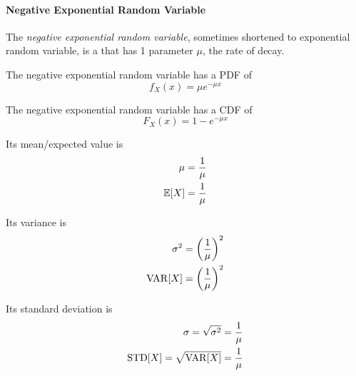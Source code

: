 \paragraph{Negative Exponential Random Variable}\label{par:Negative_Exponential_Random_Variable}
\begin{definition}\label{def:Negative_Exponential_Random_Variable}
  The \emph{negative exponential random variable}, sometimes shortened to exponential random variable, is a  that has 1 parameter $\mu$, the rate of decay.

  The negative exponential random variable has a PDF of
  \begin{equation}\label{eq:Negative_Exponential_Random_Variable-PDF}
    f_{X}(x) = \mu e^{-\mu x}
  \end{equation}

  The negative exponential random variable has a CDF of
  \begin{equation}\label{eq:Negative_Exponential_Random_Variable-CDF}
    F_{X}(x) = 1 - e^{-\mu x}
  \end{equation}

  Its mean/expected value is
  \begin{equation}\label{eq:Negative_Exponential_Random_Variable-Expected_Value}
    \begin{aligned}
      \mu &= \frac{1}{\mu} \\
      \operatorname{\operatorname{\mathbb{E}}}[X] &= \frac{1}{\mu} \\
    \end{aligned}
  \end{equation}

  Its variance is
  \begin{equation}\label{eq:Negative_Exponential_Random_Variable-Variance}
    \begin{aligned}
      \sigma^{2} &= {\left( \frac{1}{\mu} \right)}^{2} \\
      \operatorname{\operatorname{VAR}}[X] &= {\left( \frac{1}{\mu} \right)}^{2} \\
    \end{aligned}
  \end{equation}

  Its standard deviation is
  \begin{equation}\label{eq:Negative_Exponential_Random_Variable-Standard_Deviation}
    \begin{aligned}
      \sigma = \sqrt{\sigma^{2}} &= \frac{1}{\mu} \\
      \operatorname{\operatorname{STD}}[X] = \sqrt{\operatorname{\operatorname{VAR}}[X]} &= \frac{1}{\mu} \\
    \end{aligned}
  \end{equation}
\end{definition}

